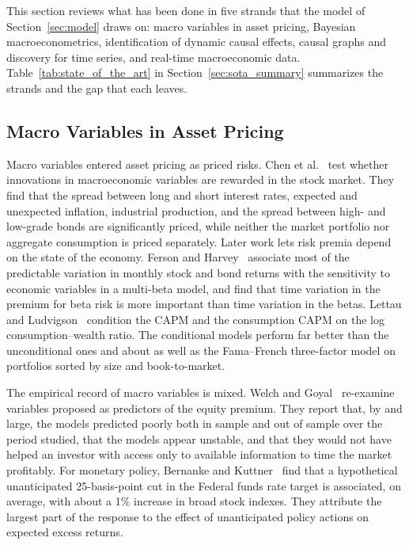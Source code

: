   This section reviews what has been done in five strands that the model of
  Section~\ref{sec:model} draws on: macro variables in asset pricing, Bayesian
  macroeconometrics, identification of dynamic causal effects, causal graphs
  and discovery for time series, and real-time macroeconomic data.
  Table~\ref{tab:state_of_the_art} in Section~\ref{sec:sota_summary} summarizes
  the strands and the gap that each leaves.

  \subsection{Macro Variables in Asset Pricing}\label{sec:sota_asset_pricing}

  Macro variables entered asset pricing as priced risks.
  Chen et al.~\cite{chen1986economic} test whether innovations in macroeconomic variables
  are rewarded in the stock market. They find that the spread between long and
  short interest rates, expected and unexpected inflation, industrial
  production, and the spread between high- and low-grade bonds are
  significantly priced, while neither the market portfolio nor aggregate
  consumption is priced separately. Later work lets risk premia depend on the
  state of the economy. Ferson and Harvey~\cite{ferson1991variation} associate most of the
  predictable variation in monthly stock and bond returns with the sensitivity
  to economic variables in a multi-beta model, and find that time variation in
  the premium for beta risk is more important than time variation in the
  betas. Lettau and Ludvigson~\cite{lettau2001resurrecting} condition the CAPM and the consumption
  CAPM on the log consumption--wealth ratio. The conditional models perform far
  better than the unconditional ones and about as well as the Fama--French
  three-factor model on portfolios sorted by size and book-to-market.

  The empirical record of macro variables is mixed. Welch and Goyal~\cite{welch2008comprehensive}
  re-examine variables proposed as predictors of the equity premium. They
  report that, by and large, the models predicted poorly both in sample and
  out of sample over the period studied, that the models appear unstable, and
  that they would not have helped an investor with access only to available
  information to time the market profitably. For monetary policy,
  Bernanke and Kuttner~\cite{bernanke2005what} find that a hypothetical unanticipated 25-basis-point cut in the
  Federal funds rate target is associated, on average, with about a 1\%
  increase in broad stock indexes. They attribute the largest part of the
  response to the effect of unanticipated policy actions on expected excess
  returns.

